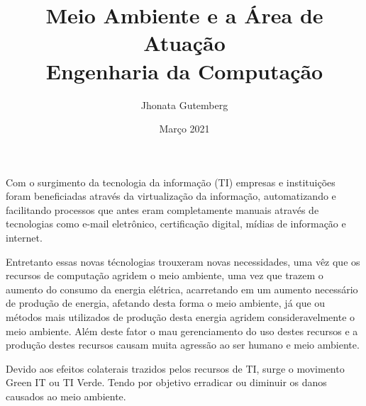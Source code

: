 \documentclass{article}
\title{
    Meio Ambiente e a Área de Atuação \\
    \large Engenharia da Computação
}
\author{
    Jhonata Gutemberg
}
\date{Março 2021}
\begin{document}
    \maketitle

    \par Com o surgimento da tecnologia da informação (TI) empresas e
    instituições foram beneficiadas através da virtualização da informação,
    automatizando e facilitando processos que antes eram completamente 
    manuais através de tecnologias como e-mail eletrônico, certificação
    digital, mídias de informação e internet.
    \par Entretanto essas novas técnologias trouxeram novas necessidades,
    uma vêz que os recursos de computação agridem o meio ambiente, uma
    vez que trazem o aumento do consumo da energia elétrica, acarretando
    em um aumento necessário de produção de energia, afetando desta forma
    o meio ambiente, já que ou métodos mais utilizados de produção desta
    energia agridem consideravelmente o meio ambiente. Além deste fator
    o mau gerenciamento do uso destes recursos e a produção destes recursos
    causam muita agressão ao ser humano e meio ambiente.
    \par Devido aos efeitos colaterais trazidos pelos recursos de TI, 
    surge o movimento Green IT ou TI Verde. Tendo por objetivo erradicar
    ou diminuir os danos causados ao meio ambiente. 
\end{document}

